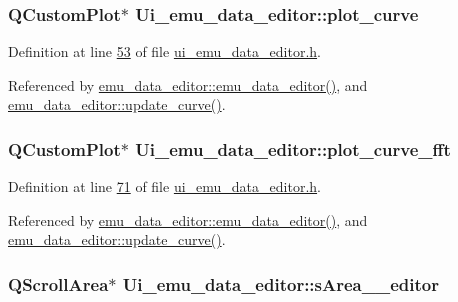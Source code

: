 \hypertarget{a00026_a1d46308dee8db7e3c99af65f13055479}{
\subsubsection[{plot\+\_\+curve}]{\setlength{\rightskip}{0pt plus 5cm}Q\+Custom\+Plot$\ast$ Ui\+\_\+emu\+\_\+data\+\_\+editor\+::plot\+\_\+curve}}\label{a00026_a1d46308dee8db7e3c99af65f13055479}


Definition at line \hyperlink{a00051_source_l00053}{53} of file \hyperlink{a00051_source}{ui\+\_\+emu\+\_\+data\+\_\+editor.\+h}.



Referenced by \hyperlink{a00035_source_l00012}{emu\+\_\+data\+\_\+editor\+::emu\+\_\+data\+\_\+editor()}, and \hyperlink{a00035_source_l00284}{emu\+\_\+data\+\_\+editor\+::update\+\_\+curve()}.

\hypertarget{a00026_a2bdf46ca3b702151408e6f6bd96b3228}{
\subsubsection[{plot\+\_\+curve\+\_\+fft}]{\setlength{\rightskip}{0pt plus 5cm}Q\+Custom\+Plot$\ast$ Ui\+\_\+emu\+\_\+data\+\_\+editor\+::plot\+\_\+curve\+\_\+fft}}\label{a00026_a2bdf46ca3b702151408e6f6bd96b3228}


Definition at line \hyperlink{a00051_source_l00071}{71} of file \hyperlink{a00051_source}{ui\+\_\+emu\+\_\+data\+\_\+editor.\+h}.



Referenced by \hyperlink{a00035_source_l00012}{emu\+\_\+data\+\_\+editor\+::emu\+\_\+data\+\_\+editor()}, and \hyperlink{a00035_source_l00284}{emu\+\_\+data\+\_\+editor\+::update\+\_\+curve()}.

\hypertarget{a00026_a6f79b6b1fe81457d76b076a543ee4089}{
\subsubsection[{s\+Area\+\_\+\+\_\+editor}]{\setlength{\rightskip}{0pt plus 5cm}Q\+Scroll\+Area$\ast$ Ui\+\_\+emu\+\_\+data\+\_\+editor\+::s\+Area\+\_\+\+\_\+editor}}\label{a00026_a6f79b6b1fe81457d76b076a543ee4089}


